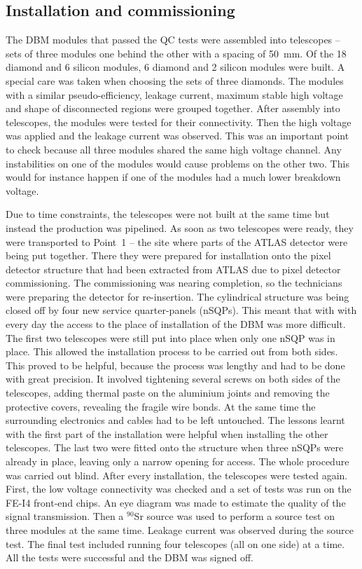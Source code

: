 \documentclass[twoside,12pt]{packages/mytustyle}  %
\begin{document}
\subsection{Installation and commissioning}
The DBM modules that passed the QC tests were assembled into telescopes -- sets of three modules one behind the other with a spacing of 50~mm. Of the 18 diamond and 6 silicon modules, 6 diamond and 2 silicon modules were built. A special care was taken when choosing the sets of three diamonds. The modules with a similar pseudo-efficiency, leakage current, maximum stable high voltage and shape of disconnected regions were grouped together. After assembly into telescopes, the modules were tested for their connectivity. Then the high voltage was applied and the leakage current was observed. This was an important point to check because all three modules shared the same high voltage channel. Any instabilities on one of the modules would cause problems on the other two. This would for instance happen if one of the modules had a much lower breakdown voltage.

Due to time constraints, the telescopes were not built at the same time but instead the production was pipelined. As soon as two telescopes were ready, they were transported to Point~1 -- the site where parts of the ATLAS detector were being put together. There they were prepared for installation onto the pixel detector structure that had been extracted from ATLAS due to pixel detector commissioning. The commissioning was nearing completion, so the technicians were preparing the detector for re-insertion. The cylindrical structure was being closed off by four new service quarter-panels (nSQPs). This meant that with with every day the access to the place of installation of the DBM was more difficult. The first two telescopes were still put into place when only one nSQP was in place. This allowed the installation process to be carried out from both sides. This proved to be helpful, because the process was lengthy and had to be done with great precision. It involved tightening several screws on both sides of the telescopes, adding thermal paste on the aluminium joints and removing the protective covers, revealing the fragile wire bonds. At the same time the surrounding electronics and cables had to be left untouched. The lessons learnt with the first part of the installation were helpful when installing the other telescopes. The last two were fitted onto the structure when three nSQPs were already in place, leaving only a narrow opening for access. The whole procedure was carried out blind. After every installation, the telescopes were tested again. First, the low voltage connectivity was checked and a set of tests was run on the FE-I4 front-end chips. An eye diagram was made to estimate the quality of the signal transmission. Then a $^{90}$Sr source was used to perform a source test on three modules at the same time. Leakage current was observed during the source test. The final test included running four telescopes (all on one side) at a time. All the tests were successful and the DBM was signed off.
\end{document}

